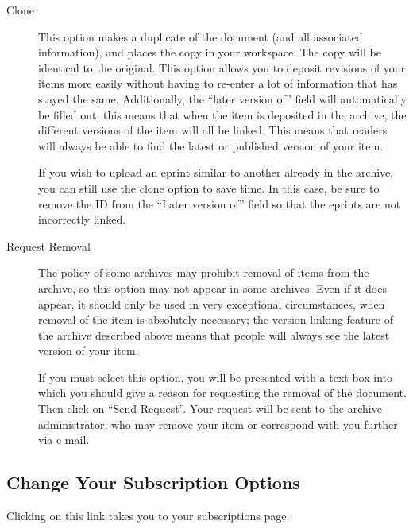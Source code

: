 \begin{description}

\item[Clone]

This option makes a duplicate of the document (and all associated information), and places the copy in your workspace. The copy will be identical to the original. This option allows you to deposit revisions of your items more easily without having to re-enter a lot of information that has stayed the same. Additionally, the ``later version of'' field will automatically be filled out; this means that when the item is deposited in the archive, the different versions of the item will all be linked. This means that readers will always be able to find the latest or published version of your item.

If you wish to upload an eprint similar to another already in the archive, you can still use the clone option to save time. In this case, be sure to remove the ID from the ``Later version of'' field so that the eprints are not incorrectly linked.


\item[Request Removal]

The policy of some archives may prohibit removal of items from the archive, so this option may not appear in some archives. Even if it does appear, it should only be used in very exceptional circumstances, when removal of the item is absolutely necessary; the version linking feature of the archive described above means that people will always see the latest version of your item.

If you must select this option, you will be presented with a text box into which you should give a reason for requesting the removal of the document. Then click on ``Send Request''. Your request will be sent to the archive administrator, who may remove your item or correspond with you further via e-mail.

\end{description}


\subsection{Change Your Subscription Options}

Clicking on this link takes you to your subscriptions page.
